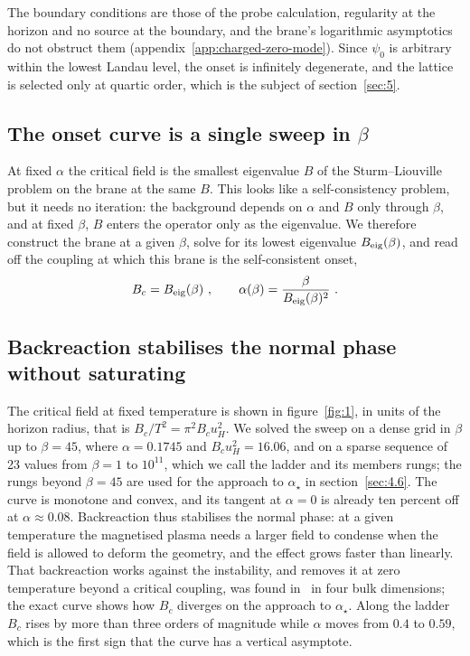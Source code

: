 The boundary conditions are those of the probe calculation, regularity at
the horizon and no source at the boundary, and the brane's logarithmic
asymptotics do not obstruct them (appendix~\ref{app:charged-zero-mode}).
Since $\psi_0$ is
arbitrary within the lowest Landau level, the onset is infinitely
degenerate, and the lattice is selected only at quartic order, which is the
subject of section~\ref{sec:5}.

\subsection{The onset curve is a single sweep in \texorpdfstring{$\beta$}{beta}}
\label{sec:3.2}

At fixed $\alpha$ the critical field is the smallest eigenvalue $B$ of the
Sturm--Liouville problem on the brane at the same $B$. This looks like a
self-consistency problem, but it needs no iteration: the background depends
on $\alpha$ and $B$ only through $\beta$, and at fixed $\beta$, $B$ enters
the operator only as the eigenvalue. We therefore construct the brane at a given
$\beta$, solve for its lowest
eigenvalue $B_{\rm eig}(\beta)$, and read off the coupling at which this
brane is the self-consistent onset,
\begin{equation}
B_c = B_{\rm eig}(\beta)~, \qquad \alpha(\beta) = \frac{\beta}{B_{\rm eig}(\beta)^2}~.
\end{equation}

\subsection{Backreaction stabilises the normal phase without saturating}
\label{sec:3.3}

The critical field at fixed temperature is shown in figure~\ref{fig:1}, in
units of the horizon radius, that is $B_c/T^2 = \pi^2 B_c u_H^2$. We solved
the sweep on a dense grid in $\beta$ up to $\beta = 45$, where
$\alpha = 0.1745$ and $B_c u_H^2 = 16.06$, and on a sparse sequence of 23
values from $\beta = 1$ to $10^{11}$, which we call the ladder and its
members rungs; the rungs beyond $\beta = 45$ are used for the approach
to $\alpha_\star$ in section~\ref{sec:4.6}. The curve is
monotone and convex, and its tangent at $\alpha = 0$ is already ten percent
off at $\alpha \approx 0.08$. Backreaction thus stabilises the normal phase: at a
given temperature the magnetised plasma needs a larger field to condense
when the field is allowed to deform the geometry, and the effect grows
faster than linearly. That backreaction works against the instability, and
removes it at zero temperature beyond a critical coupling, was found
in~\cite{Wong:2013rda} in four bulk dimensions; the exact curve shows how
$B_c$ diverges on the approach to $\alpha_\star$. Along the ladder $B_c$ rises by more than three orders
of magnitude while $\alpha$ moves from $0.4$ to $0.59$,
which is the first sign that the curve has a vertical asymptote.
